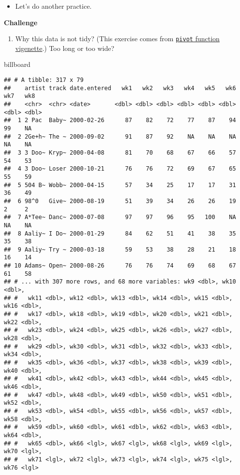 \documentclass[
]{book}
\newenvironment{Shaded}{\begin{snugshade}}{\end{snugshade}}
\newcommand{\NormalTok}[1]{#1}
\providecommand{\tightlist}{%
  \setlength{\itemsep}{0pt}\setlength{\parskip}{0pt}}
\begin{document}
\begin{itemize}
\tightlist
\item
  Let's do another practice.
\end{itemize}

\textbf{Challenge}

\begin{enumerate}
\def\labelenumi{\arabic{enumi}.}
\tightlist
\item
  Why this data is not tidy? (This exercise comes from \href{https://tidyr.tidyverse.org/articles/pivot.html}{\texttt{pivot} function vigenette}.) Too long or too wide?
\end{enumerate}

\begin{Shaded}
\begin{Highlighting}[]
\NormalTok{billboard}
\end{Highlighting}
\end{Shaded}

\begin{verbatim}
## # A tibble: 317 x 79
##    artist track date.entered   wk1   wk2   wk3   wk4   wk5   wk6   wk7   wk8
##    <chr>  <chr> <date>       <dbl> <dbl> <dbl> <dbl> <dbl> <dbl> <dbl> <dbl>
##  1 2 Pac  Baby~ 2000-02-26      87    82    72    77    87    94    99    NA
##  2 2Ge+h~ The ~ 2000-09-02      91    87    92    NA    NA    NA    NA    NA
##  3 3 Doo~ Kryp~ 2000-04-08      81    70    68    67    66    57    54    53
##  4 3 Doo~ Loser 2000-10-21      76    76    72    69    67    65    55    59
##  5 504 B~ Wobb~ 2000-04-15      57    34    25    17    17    31    36    49
##  6 98^0   Give~ 2000-08-19      51    39    34    26    26    19     2     2
##  7 A*Tee~ Danc~ 2000-07-08      97    97    96    95   100    NA    NA    NA
##  8 Aaliy~ I Do~ 2000-01-29      84    62    51    41    38    35    35    38
##  9 Aaliy~ Try ~ 2000-03-18      59    53    38    28    21    18    16    14
## 10 Adams~ Open~ 2000-08-26      76    76    74    69    68    67    61    58
## # ... with 307 more rows, and 68 more variables: wk9 <dbl>, wk10 <dbl>,
## #   wk11 <dbl>, wk12 <dbl>, wk13 <dbl>, wk14 <dbl>, wk15 <dbl>, wk16 <dbl>,
## #   wk17 <dbl>, wk18 <dbl>, wk19 <dbl>, wk20 <dbl>, wk21 <dbl>, wk22 <dbl>,
## #   wk23 <dbl>, wk24 <dbl>, wk25 <dbl>, wk26 <dbl>, wk27 <dbl>, wk28 <dbl>,
## #   wk29 <dbl>, wk30 <dbl>, wk31 <dbl>, wk32 <dbl>, wk33 <dbl>, wk34 <dbl>,
## #   wk35 <dbl>, wk36 <dbl>, wk37 <dbl>, wk38 <dbl>, wk39 <dbl>, wk40 <dbl>,
## #   wk41 <dbl>, wk42 <dbl>, wk43 <dbl>, wk44 <dbl>, wk45 <dbl>, wk46 <dbl>,
## #   wk47 <dbl>, wk48 <dbl>, wk49 <dbl>, wk50 <dbl>, wk51 <dbl>, wk52 <dbl>,
## #   wk53 <dbl>, wk54 <dbl>, wk55 <dbl>, wk56 <dbl>, wk57 <dbl>, wk58 <dbl>,
## #   wk59 <dbl>, wk60 <dbl>, wk61 <dbl>, wk62 <dbl>, wk63 <dbl>, wk64 <dbl>,
## #   wk65 <dbl>, wk66 <lgl>, wk67 <lgl>, wk68 <lgl>, wk69 <lgl>, wk70 <lgl>,
## #   wk71 <lgl>, wk72 <lgl>, wk73 <lgl>, wk74 <lgl>, wk75 <lgl>, wk76 <lgl>
\end{verbatim}
\end{document}
